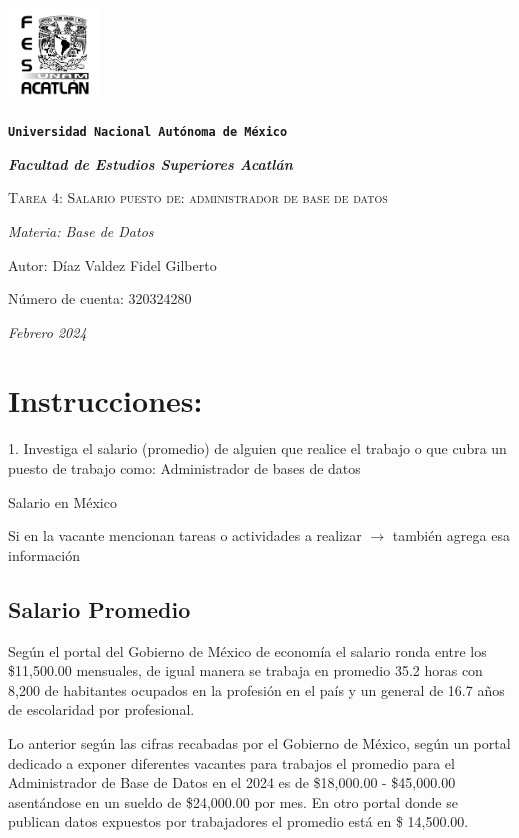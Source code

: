 \documentclass{article}
\begin{document}
\begin{titlepage}
   \centering
   {\includegraphics[width=2.5cm]{logo.png}\par}
   {\texttt{\bfseries \LARGE Universidad Nacional Autónoma de México} \par}
   \vspace{1cm}
   {\itshape \Large \bfseries Facultad de Estudios Superiores Acatlán \par}
   \vspace{3cm}
   {\scshape \Huge Tarea 4: Salario puesto de: administrador de base de datos \par}
   \vspace {3cm}
   {\slshape \Large Materia: Base de Datos \par}
   \vspace{2cm}
   {\Large Autor: Díaz Valdez Fidel Gilberto\par}
   {\Large Número de cuenta: 320324280\par}
   \vfill
   {\itshape Febrero 2024 \par}
\end{titlepage}


\section*{Instrucciones:}
1.  Investiga el salario (promedio) de alguien que realice el trabajo o que cubra un puesto de trabajo como: Administrador de bases de datos


Salario en México


Si en la vacante mencionan tareas o actividades a realizar $\rightarrow$ también agrega esa información


\subsection{Salario Promedio}
Según el portal del Gobierno de México de economía el salario ronda entre los \$11,500.00 mensuales, de igual manera
se trabaja en promedio 35.2 horas con 8,200 de habitantes ocupados en la profesión en el país y un general de 16.7 años de
escolaridad por profesional.


Lo anterior según las cifras recabadas por el Gobierno de México, según un portal dedicado a exponer diferentes vacantes
para trabajos el promedio para el Administrador de Base de Datos en el 2024 es de \$18,000.00 - \$45,000.00 asentándose en un sueldo
de \$24,000.00 por mes. En otro portal donde se publican datos expuestos por trabajadores el promedio está en \$ 14,500.00.
\end{document}
